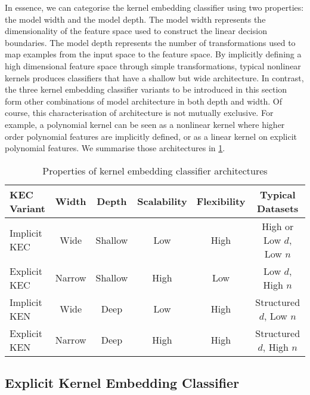 \documentclass{article}
\numberwithin{equation}{section}
\numberwithin{table}{section}
\numberwithin{algorithm}{section}
\begin{document}
	In essence, we can categorise the kernel embedding classifier using two properties: the model width and the model depth. The model width represents the dimensionality of the feature space used to construct the linear decision boundaries. The model depth represents the number of transformations used to map examples from the input space to the feature space. By implicitly defining a high dimensional feature space through simple transformations, typical nonlinear kernels produces classifiers that have a shallow but wide architecture. In contrast, the three kernel embedding classifier variants to be introduced in this section form other combinations of model architecture in both depth and width. Of course, this characterisation of architecture is not mutually exclusive. For example, a polynomial kernel can be seen as a nonlinear kernel where higher order polynomial features are implicitly defined, or as a linear kernel on explicit polynomial features. We summarise those architectures in \cref{tab:kernel_embedding_classifier_variants}.

	\begin{table}[h]
		\caption{Properties of kernel embedding classifier architectures}
		\label{tab:kernel_embedding_classifier_variants}
		\centering
		\begin{tabular}{lccccc}
			KEC Variant & Width & Depth & Scalability & Flexibility & Typical Datasets  \\
			\midrule
			Implicit KEC & Wide & Shallow & Low & High & High or Low $d$, Low $n$ \\
			Explicit KEC & Narrow & Shallow & High & Low & Low $d$, High $n$ \\
			Implicit KEN &  Wide & Deep & Low & High & Structured $d$, Low $n$ \\
			Explicit KEN & Narrow & Deep & High & High & Structured $d$, High $n$ \\ 
		\end{tabular}
	\end{table}
			
	\subsection{Explicit Kernel Embedding Classifier}
	\label{app:explicit_kernel_embedding_classifier}
	
\end{document}
